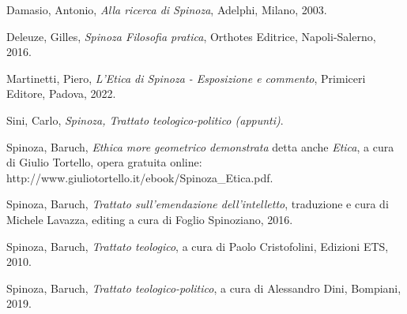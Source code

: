 \begin{thebibliography}{9}
	Damasio, Antonio, \textit{Alla ricerca di Spinoza}, Adelphi, Milano, 2003.

	Deleuze, Gilles, \textit{Spinoza Filosofia pratica}, Orthotes Editrice, Napoli-Salerno, 2016.
	
	Martinetti, Piero, \textit{L'Etica di Spinoza - Esposizione e commento}, Primiceri Editore, Padova, 2022.

	Sini, Carlo, \textit{Spinoza, Trattato teologico-politico (appunti)}.

	Spinoza, Baruch, \textit{Ethica more geometrico demonstrata} detta anche \textit{Etica}, a cura di Giulio Tortello, opera gratuita online: http://www.giuliotortello.it/ebook/Spinoza\_Etica.pdf.
	
	Spinoza, Baruch, \textit{Trattato sull'emendazione dell'intelletto}, traduzione e cura di Michele Lavazza, editing a cura di Foglio Spinoziano, 2016.

	Spinoza, Baruch, \textit{Trattato teologico}, a cura di Paolo Cristofolini, 
	Edizioni ETS, 2010.
	
	Spinoza, Baruch, \textit{Trattato teologico-politico}, a cura di Alessandro Dini, Bompiani, 2019.

\end{thebibliography}
\newpage
